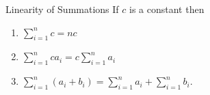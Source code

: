 \begin{frame}{Linearity of Summations}
If $ c $ is a constant then 
\begin{enumerate}
\item $\displaystyle  \sum_{i=1}^n c  =  nc $\\ \pause
\item $\displaystyle \sum_{i=1}^n ca_i =  c\sum_{i=1}^n a_i $\\ \pause
\item $\displaystyle  \sum_{i=1}^n (a_i+b_i)  =  \sum_{i=1}^n a_i + \sum_{i=1}^n b_i $.
\end{enumerate}

\end{frame}
